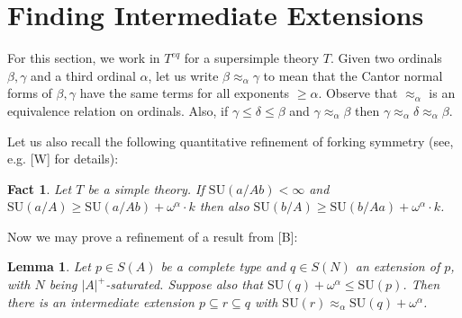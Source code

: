 \documentclass{article}
\newtheorem{fact}[theorem]{Fact}
\newtheorem{lemma}[theorem]{Lemma}
\theoremstyle{remark}
\theoremstyle{definition}
\begin{document}
\section{Finding Intermediate Extensions}
For this section, we work in $T^{eq}$ for a supersimple theory $T$. Given two ordinals $\beta,\gamma$ and a third ordinal $\alpha$, let us write $\beta\approx_\alpha \gamma$ to mean that the Cantor normal forms of $\beta,\gamma$ have the same terms for all exponents $\geq \alpha$. Observe that $\approx_\alpha$ is an equivalence relation on ordinals. Also, if $\gamma\leq \delta\leq \beta$ and $\gamma\approx_\alpha\beta$ then $\gamma\approx_\alpha\delta\approx_\alpha\beta$.



Let us also recall the following quantitative refinement of forking symmetry (see, e.g. [W] for details):
\begin{fact}
    Let $T$ be a simple theory. If $\mathrm{SU}(a/Ab)<\infty$ and $\mathrm{SU}(a/A)\geq \mathrm{SU}(a/Ab)+\omega^\alpha\cdot k$ then also $\mathrm{SU}(b/A)\geq \mathrm{SU}(b/Aa)+\omega^\alpha\cdot k$.
\end{fact}

Now we may prove a refinement of a result from [B]:

\begin{lemma}\label{EvenBetterBuechler}
    Let $p\in S(A)$ be a complete type and $q\in S(N)$ an extension of $p$, with $N$ being $|A|^+$-saturated. Suppose also that $\mathrm{SU}(q)+\omega^\alpha\leq\mathrm{SU}(p)$. Then there is an intermediate extension $p\subseteq r\subseteq q$ with $\mathrm{SU}(r)\approx_\alpha \mathrm{SU}(q)+\omega^\alpha$. %
\end{lemma}
\end{document}
